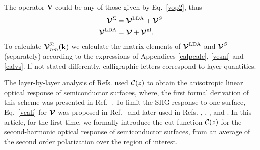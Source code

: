 \documentclass[floatfix,prb,aps,superscriptaddress,showpacs,11pt,preprint,letterpaper]{revtex4}
\begin{document}
The operator $\mathbf{V}$ could be any of those given by Eq.~\eqref{vop2},
thus
\begin{align}\label{vopii}
\boldsymbol{\mathcal{\cal V}}^{\Sigma}
&=
\boldsymbol{\mathcal{\cal V}}^{\mathrm{LDA}}
+
\boldsymbol{\mathcal{\cal V}}^{S}
\nonumber\\
\boldsymbol{\mathcal{\cal V}}^{\mathrm{LDA}}
&=
\boldsymbol{\mathcal{\cal V}}
+
\boldsymbol{\mathcal{\cal V}}^{\mathrm{nl}}
.
\end{align}
To calculate
$\boldsymbol{\mathcal{\cal V}}^{\Sigma}_{nm}(\mathbf{k})$ 
we calculate the matrix elements of 
$\boldsymbol{\mathcal{\cal V}}^{\mathrm{LDA}}$ and $\boldsymbol{\mathcal{\cal V}}^{S}$
 (separately)
according to the expressions of
Appendices \ref{calpcalc}, \ref{vesnl} and \ref{calvs}.
If not stated differently, calligraphic letters correspond to layer quantities. 

The layer-by-layer analysis of Refs.   
used ${\mathbf{\cal C}}(z)$
to obtain the  
anisotropic linear optical response of semiconductor surfaces, 
where, the first formal derivation  
of this scheme  
was presented in  
Ref.~. 
To limit the SHG response to one surface, Eq.~\eqref{vcali} 
for $\boldsymbol{\mathcal{\cal V}}$ was proposed in 
Ref.~ and later used in Refs.
,
,
,
 and . 
In this article, for the first time, we formally introduce the cut function ${\mathbf{\cal C}}(z)$ 
for the second-harmonic optical response of semiconductor surfaces,
from an average of the second order polarization over the region of interest.
\end{document}

